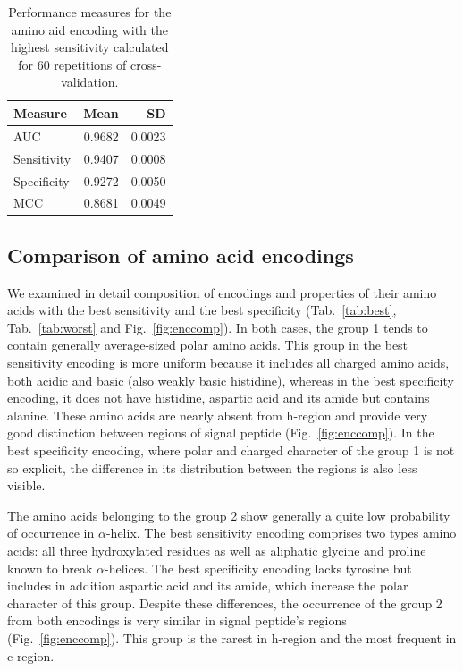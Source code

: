 \documentclass[10pt,letterpaper]{article}
\begin{document}
\begin{table}[ht]
\centering
\caption{Performance measures for the amino aid encoding with the highest sensitivity calculated for 60 repetitions of cross-validation.} 
\label{tab:perfmeas}
\begin{tabular}{lrr}
  \toprule
Measure & Mean & SD \\ 
  \midrule
AUC & 0.9682 & 0.0023 \\ 
   \rowcolor[gray]{0.85}Sensitivity & 0.9407 & 0.0008 \\ 
  Specificity & 0.9272 & 0.0050 \\ 
   \rowcolor[gray]{0.85}MCC & 0.8681 & 0.0049 \\ 
   \bottomrule
\end{tabular}
\end{table}

\subsection*{Comparison of amino acid encodings}

We examined in detail composition of encodings and properties of their amino acids with the best sensitivity and the best specificity (Tab.~\ref{tab:best}, Tab.~\ref{tab:worst} and Fig.~\ref{fig:enccomp}). In both cases, the group 1 tends to contain generally average-sized polar amino acids. This group in the best sensitivity encoding is more uniform because it includes all charged amino acids, both acidic and basic (also weakly basic histidine), whereas in the best specificity encoding, it does not have histidine, aspartic acid and its amide but contains alanine. These amino acids are nearly absent from h-region and provide very good distinction between regions of signal peptide (Fig.~\ref{fig:enccomp}). In the best specificity encoding, where polar and charged character of the group 1 is not so explicit, the difference in its distribution between the regions is also less visible.

The amino acids belonging to the group 2 show generally a quite low probability of occurrence in $\alpha$-helix. The best sensitivity encoding comprises two types amino acids: all three hydroxylated residues as well as aliphatic glycine and proline known to break $\alpha$-helices. The best specificity encoding lacks tyrosine but includes in addition aspartic acid and its amide, which increase the polar character of this group. Despite these differences, the occurrence of the group 2 from both encodings is very similar in signal peptide's regions (Fig.~\ref{fig:enccomp}). This group is the rarest in h-region and the most frequent in c-region. 
\end{document}
